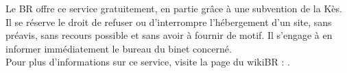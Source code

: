 Le BR offre ce service gratuitement, en partie grâce à une subvention de la Kès.
Il se réserve le droit de refuser ou d'interrompre l'hébergement d'un site, sans préavis, sans recours possible et sans avoir à fournir de motif.
Il s'engage à en informer immédiatement le bureau du binet concerné.\\
Pour plus d'informations sur ce service, visite la page du wikiBR : \newline {}.
